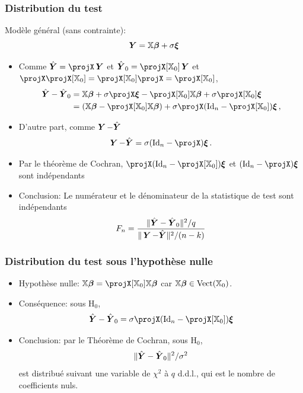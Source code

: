 \begin{frame}
\frametitle{Distribution du test}
\alert{Modèle général (sans contrainte)}:
\[
\operatorname{\boldsymbol{Y}}= \mathbb{X} \boldsymbol{\beta} + \sigma \boldsymbol{\xi}
\]
\begin{itemize}
\item Comme $\predY = \projX \bY$ et $\predY_0= \projX[\regressmat_0] \bY$ et $\projX \projX[\regressmat_0]= \projX[\regressmat_0] \projX= \projX[\regressmat_0]$,
\begin{align*}
\predY - \predY_0&= \regressmat \truebeta + \sigma \projX \bnoise - \projX[\regressmat_0] \regressmat \truebeta + \sigma \projX[\regressmat_0] \bnoise \\
&= (\regressmat \truebeta - \projX[\regressmat_0] \regressmat \truebeta) + \sigma \projX (\Id{n} - \projX[\regressmat_0]) \bnoise \eqsp,
\end{align*}
\item D'autre part, comme $\operatorname{\boldsymbol{Y}} - \hat{\boldsymbol{Y}}$
\[
\bY - \predY= \sigma (\Id{n} - \projX) \bnoise \eqsp.
\]
\item Par le théorème de Cochran, $\projX(\Id{n} - \projX[\regressmat_0]) \bnoise$ et $(\Id{n} - \projX) \bnoise$ sont \alert{indépendants}
\item \alert{Conclusion:} Le numérateur et le dénominateur de la statistique de test sont \alert{indépendants}
\[
F_n = \frac{\|\hat{\boldsymbol{Y}} - \hat{\boldsymbol{Y}}_0\|^2/q}{\| \operatorname{\boldsymbol{Y}} - \hat{\boldsymbol{Y}}\|^2/(n-k)}
\]
\end{itemize}
\end{frame}

\begin{frame}
\frametitle{Distribution du test sous l'hypothèse nulle}
\begin{itemize}
\item \alert{Hypothèse nulle}: $\regressmat \truebeta = \projX[\regressmat_0] \regressmat \truebeta$ car $\mathbb{X} \boldsymbol{\beta} \in \mathrm{Vect}(\mathbb{X}_0)$.
\item \alert{Conséquence}: sous $\mathrm{H}_0$,
\[
\predY - \predY_0 =  \sigma \projX (\Id{n} - \projX[\regressmat_0]) \bnoise
\]
\item \alert{Conclusion}: par le Théorème de Cochran,  sous $\mathrm{H}_0$,
$$
\| \hat{\boldsymbol{Y}} - \hat{\boldsymbol{Y}}_0 \|^2/ \sigma^2
$$
est distribué suivant une variable de $\chi^2$  à $q$ d.d.l., qui est le nombre de coefficients nuls.
\end{itemize}
\end{frame}

